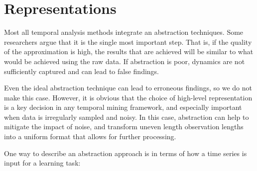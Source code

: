 \section{Representations}
Most all temporal analysis methods integrate an abstraction techniques.  Some researchers argue that it is the single most important step.  That is, if the quality of the approximation is high, the results that are achieved will be similar to what would be achieved using the raw data.  If abstraction is poor, dynamics are not sufficiently captured and can lead to false findings.

Even the ideal abstraction technique can lead to erroneous findings, so we do not make this case.  However, it is obvious that the choice of high-level representation is a key decision in any temporal mining framework, and especially important when data is irregularly sampled and noisy.  In this case, abstraction can help to mitigate the impact of noise, and transform uneven length observation lengths into a uniform format that allows for further processing.

One way to describe an abstraction approach is in terms of how a time series is input for a learning task:

